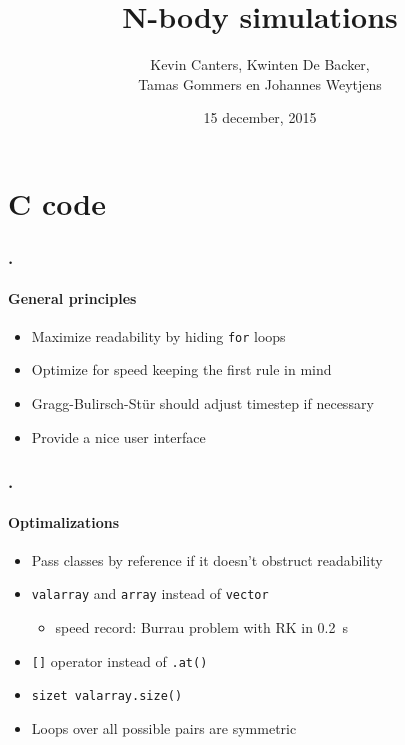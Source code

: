 \documentclass{beamer}
\title{\LARGE\textbf{N-body simulations}}
\author{\texorpdfstring{Kevin Canters, Kwinten De Backer,\\ Tamas Gommers en Johannes Weytjens}{Kevin Canters, Kwinten De Backer, Tamas Gommers en Johannes Weytjens}}
\date{15 december, 2015}
\DeclareRobustCommand{\cpluspluslogo}{\hbox{C\hspace{-0.15ex}\protect\raisebox{0.5ex}{\protect\scalebox{0.67}{++}}}}
\begin{document}
\begin{frame}
\maketitle
\end{frame}

\section{\texorpdfstring{\cpluspluslogo}{C++} code}
\begin{frame}
\frametitle{\thesection. \insertsection}
\framesubtitle{General principles}
\begin{itemize}[<+->]
	\item Maximize readability by hiding \texttt{for} loops
	\item Optimize for speed keeping the first rule in mind
	\item Gragg-Bulirsch-Stür should adjust timestep if necessary
	\item Provide a nice user interface
\end{itemize}
\end{frame}

\begin{frame}
\frametitle{\thesection. \insertsection}
\framesubtitle{Optimalizations}
\begin{itemize}
	\item<1-> Pass classes by reference if it doesn't obstruct readability
	\item<1-> \texttt{valarray} and \texttt{array} instead of \texttt{vector}
	\begin{itemize}
		\item<2-> speed record: Burrau problem with RK in \alert{\SI{0.2}{\second}}
	\end{itemize}
	\item<3-> \texttt{[]} operator instead of \texttt{.at()}
	\item<3-> \texttt{size\textunderscore t valarray.size()}
	\item<3-> Loops over all possible pairs are symmetric 
\end{itemize}

	
\end{frame}
\end{document}
